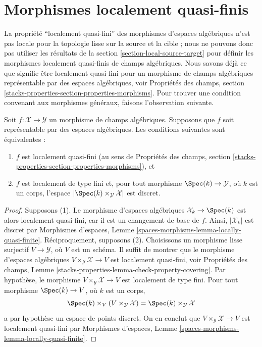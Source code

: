 \section{Morphismes localement quasi-finis}
\label{section-locally-quasi-finite}

\noindent
La propriété ``localement quasi-fini'' des morphismes d'espaces algébriques
n'est pas locale pour la topologie lisse sur la source et la cible ; nous ne
pouvons donc pas utiliser les résultats de la
section \ref{section-local-source-target} pour définir les morphismes
localement quasi-finis de champs algébriques. Nous savons déjà ce que signifie
être localement quasi-fini pour un morphisme de champs algébriques
représentable par des espaces algébriques, voir Propriétés des champs, section
\ref{stacks-properties-section-properties-morphisms}.
Pour trouver une condition convenant aux morphismes généraux, faisons
l'observation suivante.

\begin{lemma}
\label{lemma-representable-by-spaces-quasi-finite}
Soit $f : \mathcal{X} \to \mathcal{Y}$ un morphisme de champs algébriques.
Supposons que $f$ soit représentable par des espaces algébriques.
Les conditions suivantes sont équivalentes :
\begin{enumerate}
\item $f$ est localement quasi-fini (au sens de Propriétés des champs,
section \ref{stacks-properties-section-properties-morphisms}), et
\item $f$ est localement de type fini et, pour tout morphisme
$\Spec(k) \to \mathcal{Y}$, où $k$ est un corps, l'espace
$|\Spec(k) \times_\mathcal{Y} \mathcal{X}|$ est discret.
\end{enumerate}
\end{lemma}

\begin{proof}
Supposons (1). Le morphisme d'espaces algébriques
$\mathcal{X}_k \to \Spec(k)$ est alors localement quasi-fini, car il est un
changement de base de $f$. Ainsi, $|\mathcal{X}_k|$ est discret par
Morphismes d'espaces, Lemme
\ref{spaces-morphisms-lemma-locally-quasi-finite}.
Réciproquement, supposons (2). Choisissons un morphisme lisse surjectif
$V \to \mathcal{Y}$, où $V$ est un schéma. Il suffit de montrer que le
morphisme d'espaces algébriques $V \times_\mathcal{Y} \mathcal{X} \to V$
est localement quasi-fini, voir Propriétés des champs, Lemme
\ref{stacks-properties-lemma-check-property-covering}.
Par hypothèse, le morphisme $V \times_\mathcal{Y} \mathcal{X} \to V$ est
localement de type fini. Pour tout morphisme $\Spec(k) \to V$, où $k$ est
un corps,
$$
\Spec(k) \times_V (V \times_\mathcal{Y} \mathcal{X}) =
\Spec(k) \times_\mathcal{Y} \mathcal{X}
$$
a par hypothèse un espace de points discret. On en conclut que
$V \times_\mathcal{Y} \mathcal{X} \to V$ est localement quasi-fini par
Morphismes d'espaces, Lemme
\ref{spaces-morphisms-lemma-locally-quasi-finite}.
\end{proof}

